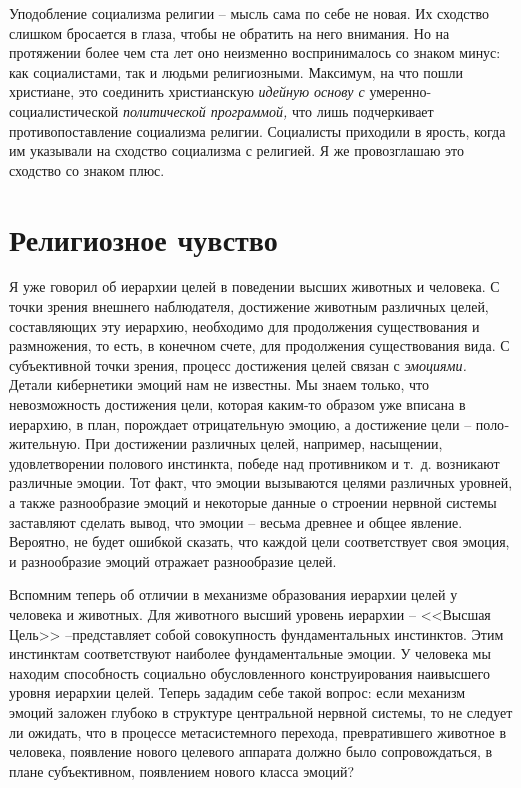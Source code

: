 \documentclass{book}
\begin{document}
Уподобление социализма религии -- мысль сама по себе не новая. Их сходство слишком бросается в глаза, чтобы не обра­тить на него внимания. Но на протяжении более чем ста лет оно неизменно воспринималось со знаком минус: как социа­листами, так и людьми религиозными. Максимум, на что пошли христиане, это соединить христианскую \textit{идейную основу с}  уме­ренно-социалистической \textit{политической программой,}  что лишь подчеркивает противопоставление социализма религии. Социа­листы приходили в ярость, когда им указывали на сходство социализма с религией. Я же провозглашаю это сходство со знаком плюс.


\section{Религиозное чувство}

Я уже говорил об иерархии целей в поведении высших живот­ных и человека. С точки зрения внешнего наблюдателя, достиже­ние животным различных целей, составляющих эту иерархию, необходимо для продолжения существования и размножения, то есть, в конечном счете, для продолжения существования вида. С субъективной точки зрения, процесс достижения целей связан с \textit{эмоциями.}  Детали кибернетики эмоций нам не извест­ны. Мы знаем только, что невозможность достижения цели, которая каким-то образом уже вписана в иерархию, в план, порождает отрицательную эмоцию, а достижение цели -- поло­жительную. При достижении различных целей, например, насыщении, удовлетворении полового инстинкта, победе над противником и т.~д. возникают различные эмоции. Тот факт, что эмоции вызываются целями различных уровней, а также разнообразие эмоций и некоторые данные о строении нервной системы заставляют сделать вывод, что эмоции -- весьма древнее и общее явление. Вероятно, не будет ошибкой сказать, что каждой цели соответствует своя эмоция, и 
разнообразие эмоций отражает разнообразие целей.

Вспомним теперь об отличии в механизме образования иерархии целей у человека и животных. Для животного высший уро­вень иерархии -- <<Высшая Цель>> --представляет собой совокуп­ность фундаментальных инстинктов. Этим инстинктам соот­ветствуют наиболее фундаментальные эмоции. У человека мы находим способность социально обусловленного конструиро­вания наивысшего уровня иерархии целей. Теперь зададим се­бе такой вопрос: если механизм эмоций заложен глубоко в структуре центральной нервной системы, то не следует ли ожи­дать, что в процессе метасистемного перехода, превратившего животное в человека, появление нового целевого аппарата должно было сопровождаться, в плане субъективном, появле­нием нового класса эмоций?
\end{document}
